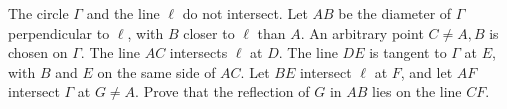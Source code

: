 The circle $\Gamma$ and the line $\ell$ do not intersect. Let $AB$ be the diameter of $\Gamma$ perpendicular to $\ell$, with $B$ closer to $\ell$ than $A$. An arbitrary point $C \neq A, B$ is chosen on $\Gamma$. The line $AC$ intersects $\ell$ at $D$. The line $DE$ is tangent to $\Gamma$ at $E$, with $B$ and $E$ on the same side of $AC$. Let $BE$ intersect $\ell$ at $F$, and let $AF$ intersect $\Gamma$ at $G \neq A$. Prove that the reflection of $G$ in $AB$ lies on the line $CF$.
